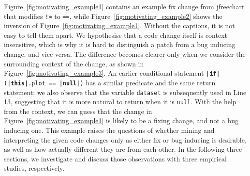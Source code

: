 \documentclass[conference]{IEEEtran}
\begin{document}
Figure~\ref{fig:motivating_example1} contains an example fix change from
jfreechart that modifies \texttt{!=} to \texttt{==}, while
Figure~\ref{fig:motivating_example2} shows the inversion of
Figure~\ref{fig:motivating_example1}. Without the captions, it is not easy to
tell them apart. We hypothesise that a code change itself is context
insensitive, which is why it is hard to distinguish a patch from a bug inducing
change, and vice versa. The difference becomes clearer only when we consider the
surrounding context of the change, as shown in
Figure~\ref{fig:motivating_example3}. An earlier conditional statement
\texttt{|\textcolor{codegrey}{\textbf{if}}|
(|\textcolor{codegrey}{\textbf{this}}|.plot ==
|\textcolor{codegrey}{\textbf{null}}|)} has a similar predicate and the same
return statement; we also observe that the variable \texttt{dataset}
is subsequently used in Line 13, suggesting that it is more natural to return
when it is
\texttt{null}. With
the help from the context, we can guess that the change in
Figure~\ref{fig:motivating_example1} is likely to be a fixing change, and not a
bug inducing one. This example raises the questions of whether mining and
interpreting the given code changes only as either fix or bug inducing is
desirable, as well as how actually different they are from each other. In the
following three sections, we investigate and discuss those observations with three
empirical studies, respectively.



  
\end{document}
